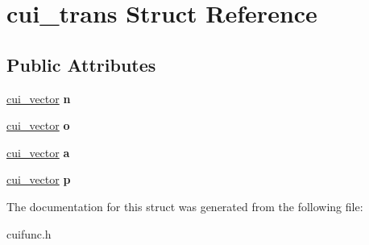 \hypertarget{structcui__trans}{\section{cui\-\_\-trans Struct Reference}
\label{structcui__trans}
}
\subsection*{Public Attributes}
\begin{DoxyCompactItemize}
\item 
\hypertarget{structcui__trans_a92d5cfdc548b16241e893f087413c42c}{\hyperlink{structcui__vector}{cui\-\_\-vector} {\bfseries n}}\label{structcui__trans_a92d5cfdc548b16241e893f087413c42c}

\item 
\hypertarget{structcui__trans_a15c4b386075e94fbca8be805532710a9}{\hyperlink{structcui__vector}{cui\-\_\-vector} {\bfseries o}}\label{structcui__trans_a15c4b386075e94fbca8be805532710a9}

\item 
\hypertarget{structcui__trans_a2e1fdb1eff8d0b166a09089086fbed9c}{\hyperlink{structcui__vector}{cui\-\_\-vector} {\bfseries a}}\label{structcui__trans_a2e1fdb1eff8d0b166a09089086fbed9c}

\item 
\hypertarget{structcui__trans_a55402ecdcdf48108ab10d6701ed906ed}{\hyperlink{structcui__vector}{cui\-\_\-vector} {\bfseries p}}\label{structcui__trans_a55402ecdcdf48108ab10d6701ed906ed}

\end{DoxyCompactItemize}


The documentation for this struct was generated from the following file\-:\begin{DoxyCompactItemize}
\item 
cuifunc.\-h\end{DoxyCompactItemize}
